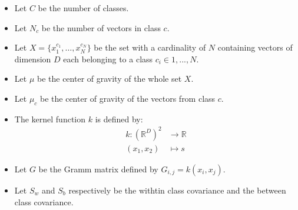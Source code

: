 
\begin{itemize}
  \item Let $C$ be the number of classes.
  \item Let $N_c$ be the number of vectors in class $c$.
  \item Let $X = \{x^{c_1}_1, \ldots, x^{c_N}_N\}$ be the set with a cardinality of $N$ containing
  vectors of dimension $D$ each belonging to a class $c_i \in {1, ..., N}$.
  \item Let $\mu$ be the center of gravity of the whole set $X$.
  \item Let $\mu_c$ be the center of gravity of the vectors from class $c$.
  \item The kernel function $k$ is defined by:
  	\begin{align*}
   		k : \left(\mathbb{R}^D\right)^2 &\to \mathbb{R}\\
   		(x_1, x_2) &\mapsto s 
   	\end{align*}
  \item Let $G$ be the Gramm matrix defined by $G_{i,j} = k(x_i, x_j)$.
  \item Let $S_w$ and $S_b$ respectively be the withtin class covariance and the between class covariance. 
\end{itemize}
